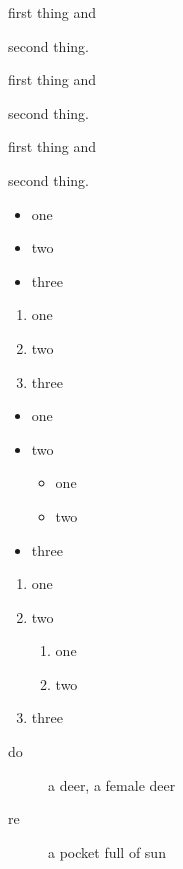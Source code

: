 \documentclass{article}
\begin{document}
\begin{inparaenum}[\em a)]
\item first thing and
\item second thing.
\end{inparaenum}

\pointedenum
\begin{inparaenum}
\item first thing and
\item second thing.
\end{inparaenum}

\pointlessenum
\begin{inparaenum}
\item first thing and
\item second thing.
\end{inparaenum}

\begin{itemize}
\item one
\item two
\item three
\end{itemize}

\begin{enumerate}
\item one
\item two
\item three
\end{enumerate}

\begin{itemize}[$\star$]
\item one
\item two
\begin{itemize}
\item one
\item two
\end{itemize}
\item three
\end{itemize}

\begin{enumerate}[\bf -a-]
\item one
\item two
\begin{enumerate}
\item one
\item two
\end{enumerate}
\item three
\end{enumerate}

\begin{description}
\item[do] a deer, a female deer
\item[re] a pocket full of sun
\end{description}
\end{document}
